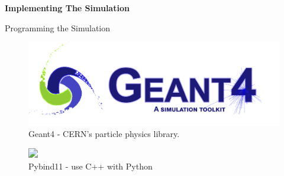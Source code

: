 \documentclass[14pt, aspectratio=169]{beamer}
\begin{document}
\begin{frame}{}
    \large \textbf{Implementing The Simulation}
\end{frame}

\begin{frame}{Programming the Simulation}
    \centering
     {
        \begin{figure}
            \centering
            \includegraphics[scale=1]{images/geant4logo.png}
            \caption{Geant4 - CERN's particle physics library. \cite{geant4logo}}
        \end{figure}
    }
     {
        \large {}
    }
     {
        \begin{figure}
            \centering
            \includegraphics<4->[scale=0.2]{images/pybind11-logo.png}
            \caption{Pybind11 - use C++ with Python \cite{pybind11}}
        \end{figure}
    }
    
\end{frame}
\end{document}
